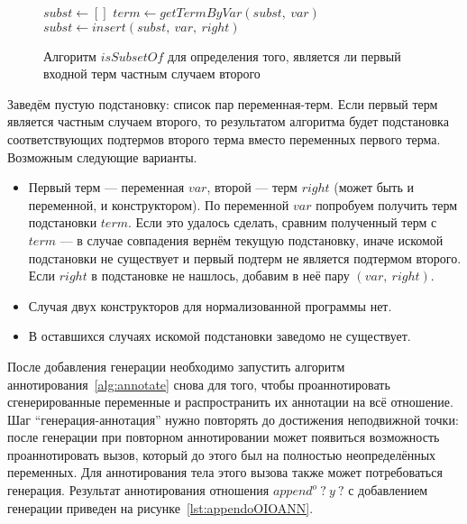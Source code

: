 \begin{figure}[h!]
  \begin{center}
  \begin{minipage}{1.1\textwidth}
\begin{algorithm}[H]
  $subst \gets []$\;
   {
     {
      $term \gets getTermByVar(subst,~var)$\;
       {
         {
        }
      } {
        $subst \gets insert(subst,~var,~right)$\;
      }
    }
  }
\end{algorithm}
  \end{minipage}
  \end{center}
  \caption{Алгоритм $isSubsetOf$ для определения того, является ли первый входной терм частным случаем второго}
  \label{alg:isSubsetOf}
\end{figure}

Заведём пустую подстановку: список пар переменная-терм.
Если первый терм является частным случаем второго, то результатом алгоритма будет подстановка соответствующих подтермов второго терма вместо переменных первого терма.
Возможным следующие варианты.
\begin{itemize}
    \item Первый терм --- переменная $var$, второй --- терм $right$ (может быть и переменной, и конструктором).
    По переменной $var$ попробуем получить терм подстановки $term$.
    Если это удалось сделать, сравним полученный терм с $term$ --- в случае совпадения вернём текущую подстановку, иначе искомой подстановки не существует и первый подтерм не является подтермом второго.
    Если $right$ в подстановке не нашлось, добавим в неё пару $(var,~right)$.
    \item Случая двух конструкторов для нормализованной программы нет.
    \item В оставшихся случаях искомой подстановки заведомо не существует.
\end{itemize}

После добавления генерации необходимо запустить алгоритм аннотирования~\ref{alg:annotate} снова для того, чтобы проаннотировать сгенерированные переменные и распространить их аннотации на всё отношение.
Шаг ``генерация-аннотация'' нужно повторять до достижения неподвижной точки: после генерации при повторном аннотировании может появиться возможность проаннотировать вызов, который до этого был на полностью неопределённых переменных.
Для аннотирования тела этого вызова также может потребоваться генерация.
Результат аннотирования отношения $append^o \ ? \ y \ ?$ с добавлением генерации приведен на рисунке~\ref{lst:appendoOIOANN}.

